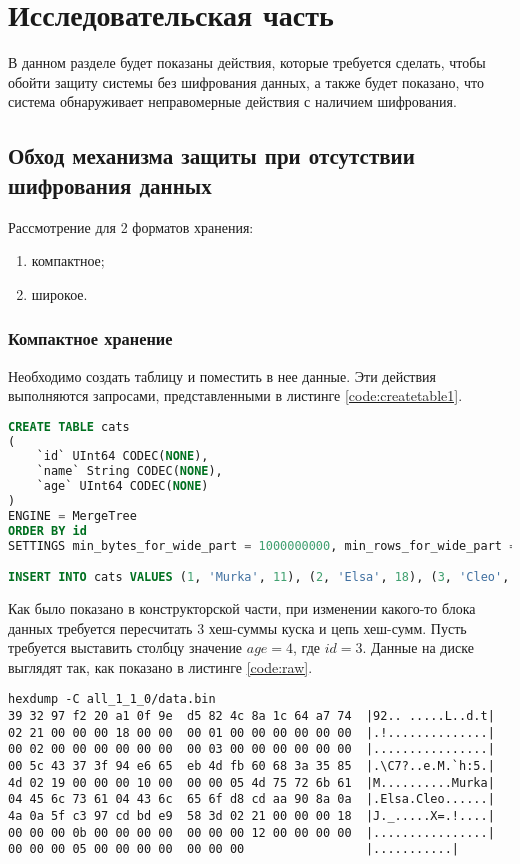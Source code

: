 \section{Исследовательская часть}

В данном разделе будет показаны действия, которые требуется сделать, чтобы обойти защиту системы без шифрования данных, а также будет показано, что система обнаруживает неправомерные действия с наличием шифрования.

\subsection{Обход механизма защиты при отсутствии шифрования данных}

Рассмотрение для 2 форматов хранения:
\begin{enumerate}
    \item компактное;
    \item широкое.
\end{enumerate}

\subsubsection{Компактное хранение}

Необходимо создать таблицу и поместить в нее данные. Эти действия выполняются запросами, представленными в листинге \ref{code:createtable1}.

\begin{lstlisting}[language=sql, label=code:createtable1, caption={Создание таблицы с компактным хранением.}]
CREATE TABLE cats
(
    `id` UInt64 CODEC(NONE),
    `name` String CODEC(NONE),
    `age` UInt64 CODEC(NONE)
)
ENGINE = MergeTree
ORDER BY id
SETTINGS min_bytes_for_wide_part = 1000000000, min_rows_for_wide_part = 1000000000, use_parts_chainer = 1

INSERT INTO cats VALUES (1, 'Murka', 11), (2, 'Elsa', 18), (3, 'Cleo', 5)
\end{lstlisting}

Как было показано в конструкторской части, при изменении какого-то блока данных требуется пересчитать 3 хеш-суммы куска и цепь хеш-сумм. Пусть требуется выставить столбцу значение $age = 4$, где $id = 3$. Данные на диске выглядят так, как показано в листинге \ref{code:raw}.

\pagebreak

\begin{lstlisting}[label=code:raw, caption={Данные записанного куска в сыром виде.}]
hexdump -C all_1_1_0/data.bin
39 32 97 f2 20 a1 0f 9e  d5 82 4c 8a 1c 64 a7 74  |92.. .....L..d.t|
02 21 00 00 00 18 00 00  00 01 00 00 00 00 00 00  |.!..............|
00 02 00 00 00 00 00 00  00 03 00 00 00 00 00 00  |................|
00 5c 43 37 3f 94 e6 65  eb 4d fb 60 68 3a 35 85  |.\C7?..e.M.`h:5.|
4d 02 19 00 00 00 10 00  00 00 05 4d 75 72 6b 61  |M..........Murka|
04 45 6c 73 61 04 43 6c  65 6f d8 cd aa 90 8a 0a  |.Elsa.Cleo......|
4a 0a 5f c3 97 cd bd e9  58 3d 02 21 00 00 00 18  |J._.....X=.!....|
00 00 00 0b 00 00 00 00  00 00 00 12 00 00 00 00  |................|
00 00 00 05 00 00 00 00  00 00 00                 |...........|
\end{lstlisting}

